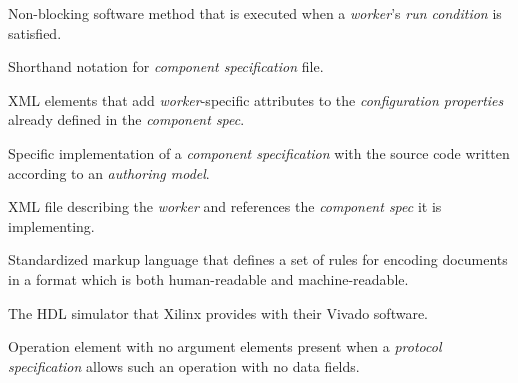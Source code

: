 \begin{description}[style=nextline]
\item[Run Method]
Non-blocking software method that is executed when a \textit{worker}'s \textit{run condition} is satisfied.

\item[Spec file]
Shorthand notation for \textit{component specification} file.

\item[SpecProperty]
XML elements that add \textit{worker}-specific attributes to the \textit{configuration properties} already defined in the \textit{component spec}.

\item[Worker]
Specific implementation of a \textit{component specification} with the source code written according to an \textit{authoring model}.

\item[Worker Description]
XML file describing the \textit{worker} and references the \textit{component spec} it is implementing.


\item[XML]
Standardized markup language that defines a set of rules for encoding documents in a format which is both human-readable and machine-readable.

\item[XSIM] The HDL simulator that Xilinx provides with their Vivado software.

\item[Zero Length Message]
Operation element with no argument elements present when a \textit{protocol specification} allows such an operation with no data fields.
\end{description}

